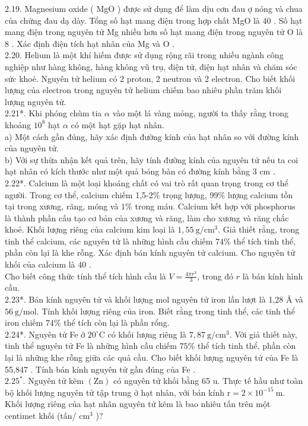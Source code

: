 \documentclass[10pt]{article}
\begin{document}
2.19. Magnesium oxide ( MgO ) được sử dụng để làm dịu cơn đau ợ nóng và chua của chứng đau dạ dày. Tổng số hạt mang điện trong hợp chất MgO là 40 . Số hạt mang điện trong nguyên tử Mg nhiều hơn số hạt mang điện trong nguyên tử O là 8 . Xác định điện tích hạt nhân của Mg và O .\\
2.20. Helium là một khí hiếm được sử dụng rộng rãi trong nhiều ngành công nghiệp như hàng không, hàng không vũ trụ, điện tử, điện hạt nhân và chăm sóc sức khoẻ. Nguyên tử helium có 2 proton, 2 neutron và 2 electron. Cho biết khối lượng của electron trong nguyên tử helium chiếm bao nhiêu phần trăm khối lượng nguyên tử.\\
2.21*. Khi phóng chùm tia $\alpha$ vào một lá vàng mỏng, người ta thấy rằng trong khoảng $10^{8}$ hạt $\alpha$ có một hạt gặp hạt nhân.\\
a) Một cách gần đúng, hãy xác định đường kính của hạt nhân so với đường kính của nguyên tử.\\
b) Với sự thừa nhận kết quả trên, hãy tính đường kính của nguyên tử nếu ta coi hạt nhân có kích thước như một quả bóng bàn có đường kính bằng 3 cm .\\
2.22*. Calcium là một loại khoáng chất có vai trò rất quan trọng trong cơ thể người. Trong cơ thể, calcium chiếm 1,5-2\% trọng lượng, 99\% lượng calcium tồn tại trong xương, răng, móng và $1 \%$ trong máu. Calcium kết hợp với phosphorus là thành phần cấu tạo cơ bản của xương và răng, làm cho xương và răng chắc khoẻ. Khối lượng riêng của calcium kim loại là $1,55 \mathrm{~g} / \mathrm{cm}^{3}$. Giả thiết rằng, trong tinh thể calcium, các nguyên tử là những hình cầu chiếm $74 \%$ thể tích tinh thể, phần còn lại là khe rỗng. Xác định bán kính nguyên tử calcium. Cho nguyên tử khối của calcium là 40 .\\
Cho biết công thức tính thể tích hình cầu là $V=\frac{4 \pi r^{3}}{3}$, trong đó $r$ là bán kính hình cầu.\\
2.23*. Bán kính nguyên tử và khối lượng mol nguyên tử iron lần lượt là 1,28 Å và $56 \mathrm{~g} / \mathrm{mol}$. Tính khối lượng riêng của iron. Biết rằng trong tinh thể, các tinh thể iron chiếm $74 \%$ thể tích còn lại là phần rổng.\\
2.24*. Nguyên tử Fe ở $20^{\circ} \mathrm{C}$ có khối lượng riêng là $7,87 \mathrm{~g} / \mathrm{cm}^{3}$. Với giả thiết này, tinh thể nguyên tử Fe là những hình cầu chiếm $75 \%$ thể tích tinh thể, phần còn lại là những khe rỗng giữa các quả cầu. Cho biết khối lượng nguyên tử của Fe là 55,847 . Tính bán kính nguyên tử gần đúng của Fe .\\
$2.25^{*}$. Nguyên tử kẽm $(\mathrm{Zn})$ có nguyên tử khối bằng 65 u. Thực tế hầu như toàn bộ khối lượng nguyên tử tập trung ở hạt nhân, với bán kính $\mathrm{r}=2 \times 10^{-15} \mathrm{~m}$. Khối lượng riêng của hạt nhân nguyên tử kẽm là bao nhiêu tấn trên một centimet khối (tấn/ $\mathrm{cm}^{3}$ )?
\end{document}
